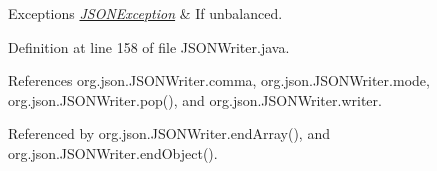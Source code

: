 \begin{DoxyExceptions}{Exceptions}
{\em \hyperlink{classorg_1_1json_1_1_j_s_o_n_exception}{J\-S\-O\-N\-Exception}} & If unbalanced. \\
\hline
\end{DoxyExceptions}


Definition at line 158 of file J\-S\-O\-N\-Writer.\-java.



References org.\-json.\-J\-S\-O\-N\-Writer.\-comma, org.\-json.\-J\-S\-O\-N\-Writer.\-mode, org.\-json.\-J\-S\-O\-N\-Writer.\-pop(), and org.\-json.\-J\-S\-O\-N\-Writer.\-writer.



Referenced by org.\-json.\-J\-S\-O\-N\-Writer.\-end\-Array(), and org.\-json.\-J\-S\-O\-N\-Writer.\-end\-Object().



